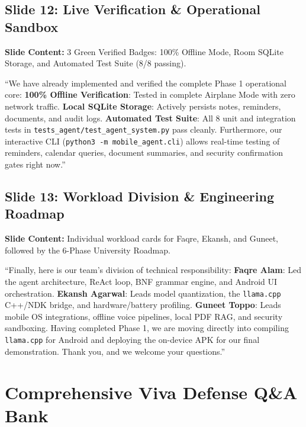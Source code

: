 \documentclass[11pt,a4paper]{article}
\begin{document}
\subsection{Slide 12: Live Verification \& Operational Sandbox}
\textbf{Slide Content:} 3 Green Verified Badges: 100\% Offline Mode, Room SQLite Storage, and Automated Test Suite (8/8 passing).

\begin{scriptbox}
``We have already implemented and verified the complete Phase 1 operational core:
\textbf{100\% Offline Verification}: Tested in complete Airplane Mode with zero network traffic.
\textbf{Local SQLite Storage}: Actively persists notes, reminders, documents, and audit logs.
\textbf{Automated Test Suite}: All 8 unit and integration tests in \texttt{tests\_agent/test\_agent\_system.py} pass cleanly.
Furthermore, our interactive CLI (\texttt{python3 -m mobile\_agent.cli}) allows real-time testing of reminders, calendar queries, document summaries, and security confirmation gates right now.''
\end{scriptbox}

\subsection{Slide 13: Workload Division \& Engineering Roadmap}
\textbf{Slide Content:} Individual workload cards for Faqre, Ekansh, and Guneet, followed by the 6-Phase University Roadmap.

\begin{scriptbox}
``Finally, here is our team's division of technical responsibility:
\textbf{Faqre Alam}: Led the agent architecture, ReAct loop, BNF grammar engine, and Android UI orchestration.
\textbf{Ekansh Agarwal}: Leads model quantization, the \texttt{llama.cpp} C++/NDK bridge, and hardware/battery profiling.
\textbf{Guneet Toppo}: Leads mobile OS integrations, offline voice pipelines, local PDF RAG, and security sandboxing.
Having completed Phase 1, we are moving directly into compiling \texttt{llama.cpp} for Android and deploying the on-device APK for our final demonstration. Thank you, and we welcome your questions.''
\end{scriptbox}

\newpage
\section{Comprehensive Viva Defense Q\&A Bank}
\end{document}
